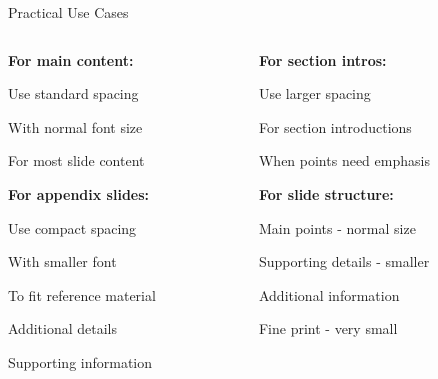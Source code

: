 \documentclass[11pt,compress,t,notes=noshow, xcolor=table]{beamer}
\begin{document}

\begin{frame}{Practical Use Cases}
  \begin{columns}[T]
    \begin{column}{0.48\textwidth}
      \textbf{For main content:}
      \begin{itemizeM}
        \item Use standard spacing
        \item With normal font size
        \item For most slide content
      \end{itemizeM}
      
      \vspace{0.3cm}
      \textbf{For appendix slides:}
      \begin{itemizeS}[small]
        \item Use compact spacing
        \item With smaller font
        \item To fit reference material
        \item Additional details
        \item Supporting information
      \end{itemizeS}
    \end{column}
    
    \begin{column}{0.48\textwidth}
      \textbf{For section intros:}
      \begin{itemizeL}
        \item Use larger spacing
        \item For section introductions
        \item When points need emphasis
      \end{itemizeL}
      
      \vspace{0.3cm}
      \textbf{For slide structure:}
      \begin{kitemize}[fs=normalsize,sep=M]
        \item Main points - normal size
        \begin{kitemize}[fs=small,sep=S]
          \item Supporting details - smaller
          \item Additional information
          \begin{kitemize}[fs=footnotesize,sep=S]
            \item Fine print - very small
          \end{kitemize}
        \end{kitemize}
      \end{kitemize}
    \end{column}
  \end{columns}
\end{frame}

\endlecture
\end{document}
